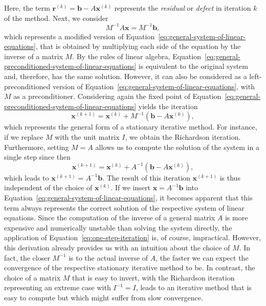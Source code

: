Here, the term $\bm{r}^{(k)} = \bm{b} - A \bm{x}^{(k)}$ represents the \emph{residual} or \emph{defect} in iteration $k$ of the method.
Next, we consider 
\begin{equation}
	M^{-1} A \bm{x} = M^{-1} \bm{b},
	\label{eq:general-preconditioned-system-of-linear-equations}
\end{equation}
which represents a modified version of Equation~\eqref{eq:general-system-of-linear-equations}, that is obtained by multiplying each side of the equation by the inverse of a matrix $M$.
By the rules of linear algebra, Equation~\ref{eq:general-preconditioned-system-of-linear-equations} is equivalent to the original system and, therefore, has the same solution.
However, it can also be considered as a left-preconditioned version of Equation~\eqref{eq:general-system-of-linear-equations}, with $M$ as a preconditioner.
Considering again the fixed point of Equation~\eqref{eq:general-preconditioned-system-of-linear-equations} yields the iteration
\begin{equation}
	\bm{x}^{(k+1)} = \bm{x}^{(k)} + M^{-1}(\bm b - A \bm{x}^{(k)}),
	\label{eq:general-stationary-iterative-method}
\end{equation}
which represents the general form of a stationary iterative method. 
For instance, if we replace $M$ with the unit matrix $I$, we obtain the Richardson iteration.
Furthermore, setting $M = A$ allows us to compute the solution of the system in a single step since then
\begin{equation}
	\bm{x}^{(k+1)} = \bm{x}^{(k)} + A^{-1}(\bm b - A \bm{x}^{(k)}),
	\label{eq:one-step-iteration}
\end{equation}
which leads to $\bm{x}^{(k+1)} = A^{-1}\bm b$.
The result of this iteration $\bm{x}^{(k+1)}$ is thus independent of the choice of $\bm{x}^{(k)}$. 
If we insert $\bm{x} = A^{-1}\bm b$ into Equation~\eqref{eq:general-system-of-linear-equations}, it becomes apparent that this term always represents the correct solution of the respective system of linear equations.
Since the computation of the inverse of a general matrix $A$ is more expensive and numerically unstable than solving the system directly, the application of Equation~\eqref{eq:one-step-iteration} is, of course, impractical.
However, this derivation already provides us with an intuition about the choice of $M$.
In fact, the closer $M^{-1}$ is to the actual inverse of $A$, the faster we can expect the convergence of the respective stationary iterative method to be.
In contrast, the choice of a matrix $M$ that is easy to invert, with the Richardson iteration representing an extreme case with $I^{-1} = I$, leads to an iterative method that is easy to compute but which might suffer from slow convergence.
